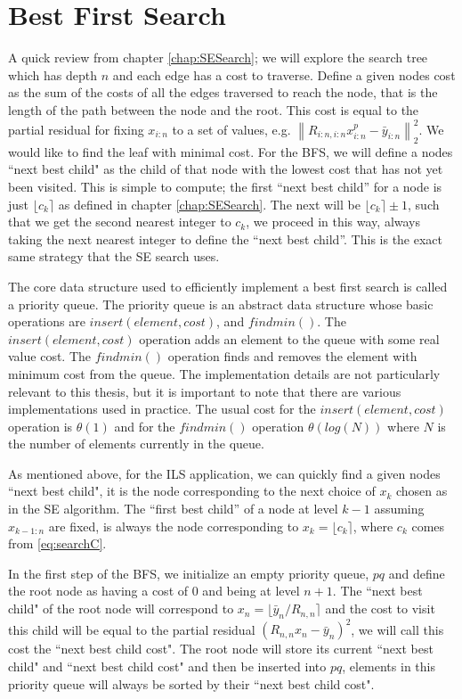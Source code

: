 \documentclass[12pt,Bold,letterpaper]{mcgilletdclass}
\newcommand{\vsp}{\vspace{\baselineskip}}
\begin{document}
\vsp \section{Best First Search} \label{sec:BFS}

A quick review from chapter \ref{chap:SESearch}; we will explore the search tree which has depth $n$ and each edge has a cost to traverse. Define a given nodes cost as the sum of the costs of all the edges traversed to reach the node, that is the length of the path between the node and the root. This cost is equal to the partial residual for fixing $x_{i:n}$ to a set of values, e.g. $\left \| R_{i:n,i:n}x_{i:n}^p - \bar{y}_{i:n}\right \|_2^2$. We would like to find the leaf with minimal cost. For the BFS, we will define a nodes ``next best child" as the child of that node with the lowest cost that has not yet been visited. This is simple to compute; the first ``next best child'' for a node is just $\lfloor c_k \rceil$ as defined in chapter \ref{chap:SESearch}. The next will be $\lfloor c_k \rceil \pm 1$, such that we get the second nearest integer to $c_k$, we proceed in this way, always taking the next nearest integer to define the ``next best child''. This is the exact same strategy that the SE search uses.

The core data structure used to efficiently implement a best first search is called a priority queue. The priority queue is an abstract data structure whose basic operations are $insert(element,cost)$, and $findmin()$. The $insert(element,cost)$ operation adds an element to the queue with some real value cost. The $findmin()$ operation finds and removes the element with minimum cost from the queue. The implementation details are not particularly relevant to this thesis, but it is important to note that there are various implementations used in practice. The usual cost for the $insert(element,cost)$ operation is $\theta(1)$ and for the $findmin()$ operation $\theta(log(N))$ where $N$ is the number of elements currently in the queue.

As mentioned above, for the ILS application, we can quickly find a given nodes ``next best child", it is the node corresponding to the next choice of $x_k$ chosen as in the SE algorithm. The ``first best child'' of a node at level $k-1$ assuming $x_{k-1:n}$ are fixed, is always the node corresponding to $x_k = \lfloor c_k \rceil$, where $c_k$ comes from \eqref{eq:searchC}.

In the first step of the BFS, we initialize an empty priority queue, $pq$ and define the root node as having a cost of $0$ and being at level $n+1$. The ``next best child" of the root node will correspond to $x_n = \lfloor \bar{y}_n/R_{n,n} \rceil$ and the cost to visit this child will be equal to the partial residual $(R_{n,n}x_n - \bar{y}_n)^2$, we will call this cost the ``next best child cost". The root node will store its current ``next best child" and ``next best child cost" and then be inserted into $pq$, elements in this priority queue will always be sorted by their ``next best child cost".
\end{document}
